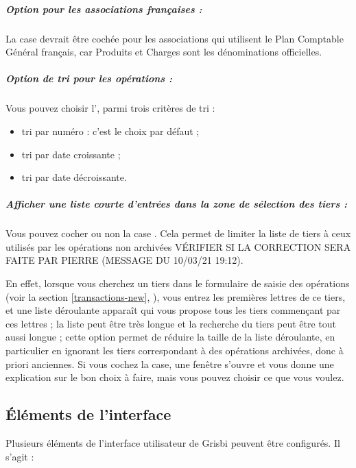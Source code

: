 \subparagraph{Option pour les associations françaises :\label{setup-display-third-french}}

La case  devrait être cochée pour les associations qui utilisent le Plan Comptable Général français, car Produits et Charges sont les dénominations officielles. 


\subparagraph{Option de tri pour les opérations :\label{setup-display-third-sort}}

Vous pouvez choisir l', parmi trois critères de \gls{tri} :

\begin{itemize}
	\item tri par numéro : c'est le choix par défaut ;
	\item tri par date croissante ;
	\item tri par date décroissante.
\end{itemize} 


\subparagraph{Afficher une liste courte d'entrées dans la zone de sélection des tiers :\label{setup-display-third-list}}

Vous pouvez cocher ou non la case . Cela permet de limiter la liste de tiers à ceux utilisés par les opérations non archivées VÉRIFIER SI LA CORRECTION SERA FAITE PAR PIERRE (MESSAGE DU 10/03/21 19:12). 

En effet, lorsque vous cherchez un tiers dans le formulaire de saisie des opérations (voir la section \vref{transactions-new}, ), vous entrez les premières lettres de ce tiers, et une liste déroulante apparaît qui vous propose tous les tiers commençant par ces lettres ; la liste peut être très longue et la recherche du tiers peut être tout aussi longue ; cette option permet de réduire la taille de la liste déroulante, en particulier en ignorant les tiers correspondant à des opérations archivées, donc à priori anciennes. 
Si vous cochez la case, une fenêtre s'ouvre et vous donne une explication sur le bon choix à faire, mais vous pouvez choisir ce que vous voulez.


\subsection{Éléments de l'interface\label{setup-display-toolbars}}

Plusieurs éléments de l'interface utilisateur de Grisbi peuvent être configurés. Il s'agit :

